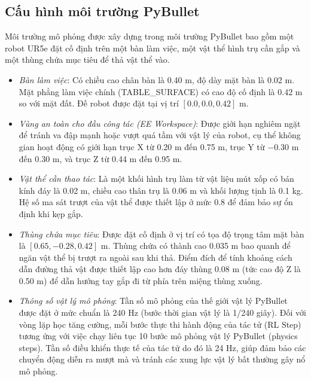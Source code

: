 \documentclass[conference]{IEEEtran}
\begin{document}
\subsection{Cấu hình môi trường PyBullet}
Môi trường mô phỏng được xây dựng trong môi trường PyBullet \cite{coumans2021pybullet} bao gồm một robot UR5e đặt cố định trên một bàn làm việc, một vật thể hình trụ cần gắp và một thùng chứa mục tiêu để thả vật thể vào.
\begin{itemize}
    \item \textit{Bàn làm việc}: Có chiều cao chân bàn là 0.40 m, độ dày mặt bàn là 0.02 m. Mặt phẳng làm việc chính (TABLE\_SURFACE) có cao độ cố định là 0.42 m so với mặt đất. Đế robot được đặt tại vị trí $[0.0, 0.0, 0.42]$ m.
    \item \textit{Vùng an toàn cho đầu công tác (EE Workspace)}: Được giới hạn nghiêm ngặt để tránh va đập mạnh hoặc vượt quá tầm với vật lý của robot, cụ thể không gian hoạt động có giới hạn trục X từ 0.20 m đến 0.75 m, trục Y từ $-0.30$ m đến 0.30 m, và trục Z từ 0.44 m đến 0.95 m.
    \item \textit{Vật thể cần thao tác}: Là một khối hình trụ làm từ vật liệu mút xốp có bán kính đáy là 0.02 m, chiều cao thân trụ là 0.06 m và khối lượng tịnh là 0.1 kg. Hệ số ma sát trượt của vật thể được thiết lập ở mức 0.8 để đảm bảo sự ổn định khi kẹp gắp.
    \item \textit{Thùng chứa mục tiêu}: Được đặt cố định ở vị trí có tọa độ trọng tâm mặt bàn là $[0.65, -0.28, 0.42]$ m. Thùng chứa có thành cao 0.035 m bao quanh để ngăn vật thể bị trượt ra ngoài sau khi thả. Điểm đích để tính khoảng cách dẫn đường thả vật được thiết lập cao hơn đáy thùng 0.08 m (tức cao độ Z là 0.50 m) để dẫn hướng tay gắp đi từ phía trên miệng thùng xuống.
    \item \textit{Thông số vật lý mô phỏng}: Tần số mô phỏng của thế giới vật lý PyBullet được đặt ở mức chuẩn là 240 Hz (bước thời gian vật lý là 1/240 giây). Đối với vòng lặp học tăng cường, mỗi bước thực thi hành động của tác tử (RL Step) tương ứng với việc chạy liên tục 10 bước mô phỏng vật lý PyBullet (physics steps). Tần số điều khiển thực tế của tác tử do đó là 24 Hz, giúp đảm bảo các chuyển động diễn ra mượt mà và tránh các xung lực vật lý bất thường gây nổ mô phỏng.
\end{itemize}
\end{document}
